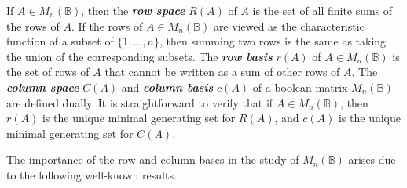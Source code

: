 \documentclass[11pt]{article}
\newcommand{\defn}[1]{\textbf{\textit{#1}}}
\numberwithin{equation}{section}
\newcommand{\B}{\mathbb{B}}
\newcommand{\Bn}{M_n(\B)}
\begin{document}
If $A \in \Bn$, then the \defn{row space} $R(A)$ of $A$ is the set of 
all finite sums of the rows of $A$.  If the rows of $A\in \Bn$ are viewed as
the characteristic function of a subset of $\{1, \ldots, n\}$, then summing two
rows is the same as taking the union of the corresponding subsets.  The
\defn{row basis} $r(A)$ of $A\in \Bn$ is the set of rows of $A$ that cannot be
written as a sum of other rows of $A$. The \defn{column space}
$C(A)$ and \defn{column basis} $c(A)$ of a boolean matrix $\Bn$ are defined
dually. It is straightforward to verify that if $A \in \Bn$, then $r(A)$ is the
unique minimal generating set for $R(A)$, and $c(A)$ is the unique minimal
generating set for $C(A)$. 


The importance of the row and column bases in the study of $\Bn$ arises due to
the following well-known results.
\end{document}
